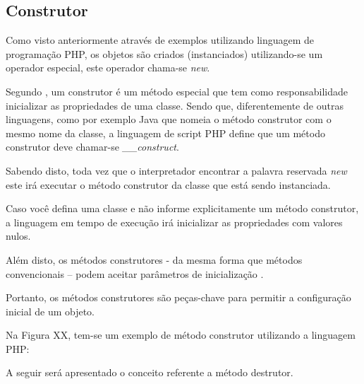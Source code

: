 \subsection{Construtor}

Como visto anteriormente através de exemplos utilizando linguagem de
programação PHP, os objetos são criados (instanciados) utilizando-se um
operador especial, este operador chama-se \textit{new}.

Segundo , um construtor é um método especial que tem
como responsabilidade inicializar as propriedades de uma classe. Sendo que,
diferentemente de outras linguagens, como por exemplo Java que nomeia o  método
construtor com o mesmo nome da classe, a linguagem de script PHP define  que um
método construtor deve chamar-se \textit{\_\_construct}.

Sabendo disto, toda vez que o interpretador encontrar a palavra reservada
\textit{new} este irá executar o método construtor da classe que está sendo
instanciada.

Caso você defina uma classe e não informe explicitamente um método construtor, a
linguagem em tempo de execução irá inicializar as propriedades com valores nulos.

Além disto, os métodos construtores - da mesma forma que métodos convencionais –
podem aceitar parâmetros de inicialização \cite{learningJava}.

Portanto, os métodos construtores são peças-chave para permitir a configuração
inicial de um objeto.

Na Figura XX, tem-se um exemplo de método construtor utilizando
a linguagem PHP:

A seguir será apresentado o conceito referente a método destrutor.
